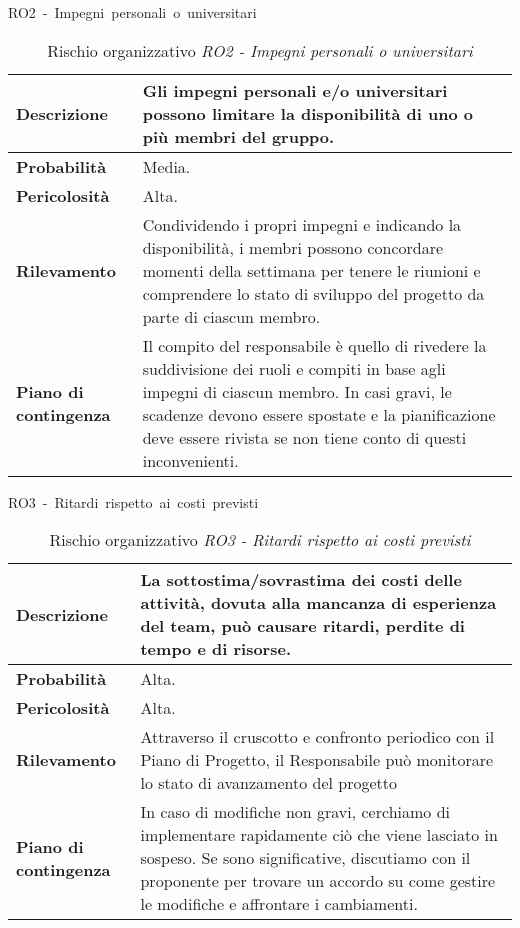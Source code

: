 \begin{table}[!h]
    \centering
    \hbox{RO2 - Impegni personali o universitari}
    \vspace{0.3cm}
	\begin{tabular}{|l|p{10cm}|} 
		\hline
		\textbf{Descrizione} & Gli impegni personali e/o universitari possono limitare la disponibilità di uno o più membri del gruppo. \\ 
        \hline
        \textbf{Probabilità} & Media. \\
        \hline
        \textbf{Pericolosità} & Alta. \\
        \hline
        \textbf{Rilevamento} & Condividendo i propri impegni e indicando la disponibilità, i membri possono concordare momenti della settimana per tenere le riunioni e comprendere lo stato di sviluppo del progetto da parte di ciascun membro. \\
        \hline
        \textbf{Piano di contingenza} & Il compito del responsabile è quello di rivedere la suddivisione dei ruoli e compiti in base agli impegni di ciascun membro. In casi gravi, le scadenze devono essere spostate e la pianificazione deve essere rivista se non tiene conto di questi inconvenienti.\\
		\hline
	\end{tabular}
    \caption{Rischio organizzativo \textit{RO2 - Impegni personali o universitari}}
    \label{table:2}
\end{table}

\begin{table}[!h]
    \centering
    \hbox{RO3 - Ritardi rispetto ai costi previsti}
    \vspace{0.3cm}
	\begin{tabular}{|l|p{10cm}|} 
		\hline
		\textbf{Descrizione} & La sottostima/sovrastima dei costi delle attività, dovuta alla mancanza di esperienza del team, può causare ritardi, perdite di tempo e di risorse. \\ 
        \hline
        \textbf{Probabilità} & Alta. \\
        \hline
        \textbf{Pericolosità} & Alta. \\
        \hline
        \textbf{Rilevamento} & Attraverso il cruscotto e confronto periodico con il Piano di Progetto, il Responsabile può monitorare lo stato di avanzamento del progetto \\
        \hline
        \textbf{Piano di contingenza} & In caso di modifiche non gravi, cerchiamo di implementare rapidamente ciò che viene lasciato in sospeso. Se sono significative, discutiamo con il proponente per trovare un accordo su come gestire le modifiche e affrontare i cambiamenti.\\
		\hline
	\end{tabular}
    \caption{Rischio organizzativo \textit{RO3 - Ritardi rispetto ai costi previsti}}
    \label{table:3}
\end{table}

